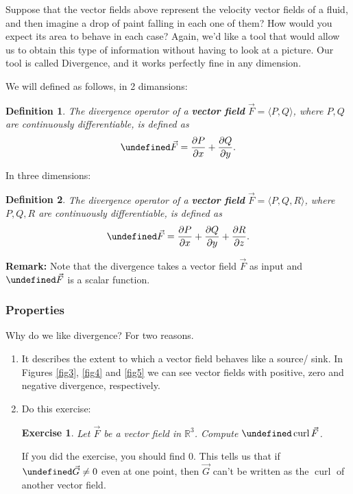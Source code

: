 \documentclass[12pt]{article}
\newcommand{\p}{\partial}
\newcommand{\R}{ \mathbb{R}}
\newcommand{\vF}{\vec{F}}
\renewcommand{\lg}{\langle}
\newcommand{\rg}{\rangle}
\DeclareMathOperator{\curl}{curl}
\let \div \undefined
\DeclareMathOperator{\div}{div}
\newtheorem{exr}{Exercise}
\newtheorem{defn}{Definition}
\begin{document}
Suppose that the vector fields above represent the velocity vector fields of a fluid, and then imagine a drop of paint falling in each one of them? How would you expect its area to behave in each case? Again, we'd like a tool that would allow us to obtain this type of information without having to look at a picture. Our tool is called Divergence, and it works perfectly fine in any dimension.

We will defined as follows, in 2 dimansions:

\begin{defn}
The divergence operator of a \textbf{vector field} $\vF=\lg P,Q \rg$, where $P, Q$ are continuously differentiable, is defined as \begin{equation}
\div\vF=\frac{\p P}{\p x}+\frac{\p Q}{\p y}.
\end{equation}
\end{defn}

In three dimensions:

\begin{defn}
The divergence operator of a \textbf{vector field} $\vF=\lg P,Q,R \rg$, where $P, Q, R$ are continuously differentiable, is defined as \begin{equation}
\div\vF=\frac{\p P}{\p x}+\frac{\p Q}{\p y}+\frac{\p R}{\p z}.
\end{equation}
\end{defn}

\textbf{Remark:} Note that the divergence takes a vector field $\vF$ as input and $\div\vF$ is a scalar function.

\subsubsection*{Properties}

Why do we like divergence? For two reasons.
\begin{enumerate}
\item  It describes the extent to which a vector field behaves like a source/ sink. In Figures \ref{fig3}, \ref{fig4} and \ref{fig5} we can see vector fields with positive, zero and negative divergence, respectively. 
\item Do this exercise:
\begin{exr}
Let $\vF$ be a vector field in $\R^3$. Compute $\div\curl\vF$. 
\end{exr}
If you did the exercise, you should find 0. This tells us that if $\div \vec{G}\neq 0$ even at one point, then $\vec{G}$ can't be written as the $\curl $ of another vector field.
\end{enumerate}
\end{document}
